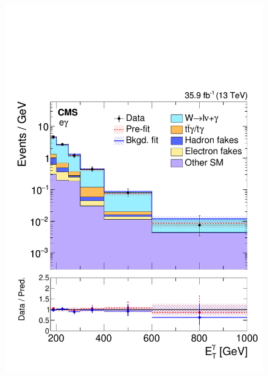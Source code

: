 \begin{figure}[htbp]
{    \includegraphics[]{Analysis/Figures/results/bonly_monoel.pdf}
}
\end{figure}
